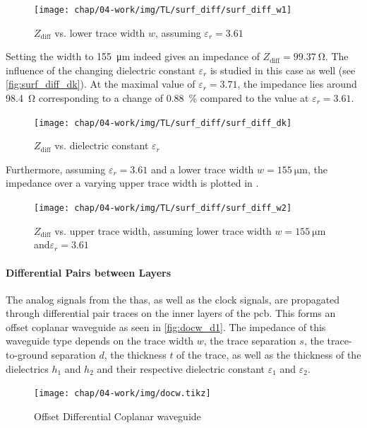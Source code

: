 \begin{figure}[tbh]
	\centering
	\texttt{[image: chap/04-work/img/TL/surf\_diff/surf\_diff\_w1]}
	\caption[DCWG, $Z_\text{diff}$ vs. $w$]{$Z_\text{diff}$ vs. lower trace width $w$, assuming $\varepsilon_r = 3.61$}
	\label{fig:surf_diff_w1}
\end{figure}
Setting the width to \SI{155}{\micro \meter} indeed gives an impedance of $Z_\text{diff} = \SI{99.37}{\ohm}$.
The influence of the changing dielectric constant $\varepsilon_r$ is studied in this case as well (see \autoref{fig:surf_diff_dk}). 
At the maximal value of $\varepsilon_r = 3.71$, the impedance lies around \SI{98.4}{\ohm} corresponding to a change of \SI{0.88}{\percent} compared to the value at $\varepsilon_r = 3.61$. 
\begin{figure}[tbh]
	\centering
	\texttt{[image: chap/04-work/img/TL/surf\_diff/surf\_diff\_dk]}
	\caption[DCWG, $Z_\text{diff}$ vs. $\varepsilon_r$]{$Z_\text{diff}$ vs. dielectric constant $\varepsilon_r$}
	\label{fig:surf_diff_dk}
\end{figure}


Furthermore, assuming $\varepsilon_r = 3.61$ and a lower trace width $w = \SI{155}{\micro \meter}$, the impedance over a varying upper trace width is plotted in .


\begin{figure}[tbh]
	\centering
	\texttt{[image: chap/04-work/img/TL/surf\_diff/surf\_diff\_w2]}
	\caption[DCWG, $Z_\text{diff}$ vs. upper trace width]{$Z_\text{diff}$ vs. upper trace width, assuming lower trace width $w = \SI{155}{\micro \meter}$ and$\varepsilon_r = 3.61$}
	\label{fig:surf_diff_w2}
\end{figure}

\paragraph{Differential Pairs between Layers}
The analog signals from the \glspl{tha}, as well as the clock signals, are propagated through differential pair traces on the inner layers of the \gls{pcb}. 
This forms an offset coplanar waveguide as seen in \autoref{fig:docw_d1}.
The impedance of this waveguide type depends on the trace width $w$, the trace separation $s$, the trace-to-ground separation $d$, the thickness $t$ of the trace, as well as the thickness of the dielectrics $h_1$ and $h_2$ and their respective dielectric constant $\varepsilon_1$ and $\varepsilon_2$.

\begin{figure}[tbh]
	\centering
	\texttt{[image: chap/04-work/img/docw.tikz]}
	\caption{Offset Differential Coplanar waveguide}
	\label{fig:docw_d1}
\end{figure}

